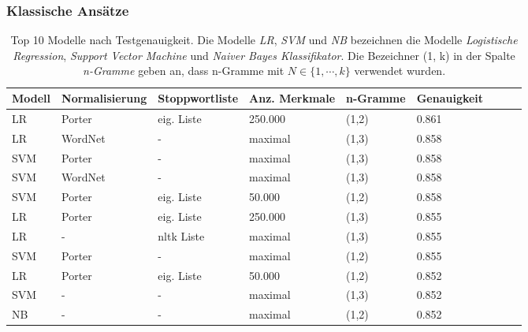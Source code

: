 \subsubsection{Klassische Ansätze}

\begin{table}
    \begin{tabular}{lllllllrr}
        \toprule
        Modell & Normalisierung & Stoppwortliste   & Anz. Merkmale & n-Gramme & Genauigkeit \\
        \midrule
        LR     & Porter         & eig. Liste       & 250.000       & (1,2)    & 0.861       \\
        LR     & WordNet        & -                & maximal       & (1,3)    & 0.858       \\
        SVM    & Porter         & -                & maximal       & (1,3)    & 0.858       \\
        SVM    & WordNet        & -                & maximal       & (1,3)    & 0.858       \\
        SVM    & Porter         & eig. Liste       & 50.000        & (1,2)    & 0.858       \\
        LR     & Porter         & eig. Liste       & 250.000       & (1,3)    & 0.855       \\
        LR     & -              & \gls{nltk} Liste & maximal       & (1,3)    & 0.855       \\
        SVM    & Porter         & -                & maximal       & (1,2)    & 0.855       \\
        LR     & Porter         & eig. Liste       & 50.000        & (1,2)    & 0.852       \\
        SVM    & -              & -                & maximal       & (1,3)    & 0.852       \\
        NB     & -              & -                & maximal       & (1,2)    & 0.852       \\
        \bottomrule
    \end{tabular}
    \caption{
        Top 10 Modelle nach Testgenauigkeit.
        Die Modelle \textit{LR}, \textit{SVM} und \textit{NB} bezeichnen die Modelle \textit{Logistische Regression}, \textit{Support Vector Machine} und \textit{Naiver Bayes Klassifikator}.
        Die Bezeichner (1, k) in der Spalte \textit{n-Gramme} geben an, dass n-Gramme mit $N\in\lbrace1,\cdots,k\rbrace$ verwendet wurden.
    }
    \label{tab:top-10-models}
\end{table}

